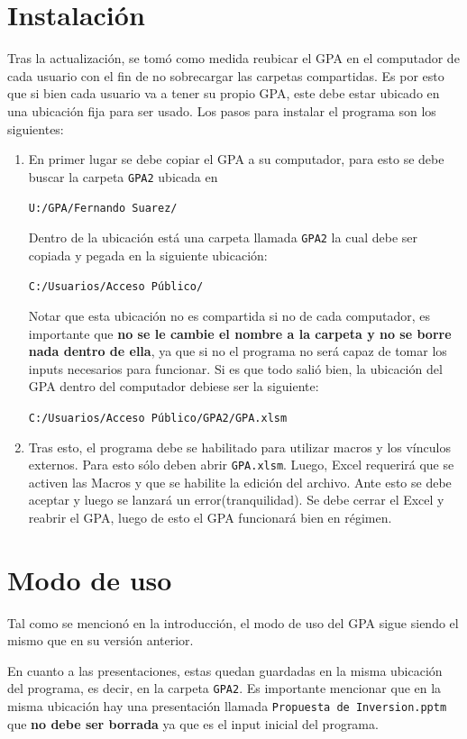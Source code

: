 \documentclass{article}
\begin{document}
\section{Instalación}
Tras la actualización, se tomó como medida reubicar el GPA en el computador de cada usuario con el fin de no sobrecargar las carpetas compartidas. Es por esto que si bien cada usuario va a tener su propio GPA, este debe estar ubicado en una ubicación fija para ser usado. Los pasos para instalar el programa son los siguientes:
\begin{enumerate}
\item En primer lugar se debe copiar el GPA a su computador, para esto se debe buscar la carpeta \texttt{GPA2} ubicada en
\begin{center}
\texttt{U:/GPA/Fernando Suarez/ } 
\end{center}
Dentro de la ubicación está una carpeta llamada \texttt{GPA2} la cual debe ser copiada y pegada en la siguiente ubicación:
\begin{center}
\texttt{C:/Usuarios/Acceso Público/ } 
\end{center}
Notar que esta ubicación no es compartida si no de cada computador, es importante que \textbf{no se le cambie el nombre a la carpeta y no se borre nada dentro de ella}, ya que si no el programa no será capaz de tomar los inputs necesarios para funcionar. Si es que todo salió bien, la ubicación del GPA dentro del computador debiese ser la siguiente:
\begin{center}
\texttt{C:/Usuarios/Acceso Público/GPA2/GPA.xlsm } 
\end{center}
\item Tras esto, el programa debe se habilitado para utilizar macros y los vínculos externos. Para esto sólo deben abrir \texttt{GPA.xlsm}. Luego, Excel requerirá que se activen las Macros y que se habilite la edición del archivo. Ante esto se debe aceptar y luego se lanzará un error(tranquilidad). Se debe cerrar el Excel y reabrir el GPA, luego de esto el GPA funcionará bien en régimen.

\end{enumerate}
\section{Modo de uso}
Tal como se mencionó en la introducción, el modo de uso del GPA sigue siendo el mismo que en su versión anterior.

En cuanto a las presentaciones, estas quedan guardadas en la misma ubicación del programa, es decir, en la carpeta \texttt{GPA2}. Es importante mencionar que en la misma ubicación hay una presentación llamada \texttt{Propuesta de Inversion.pptm} que \textbf{no debe ser borrada} ya que es el input inicial del programa.
\end{document}

